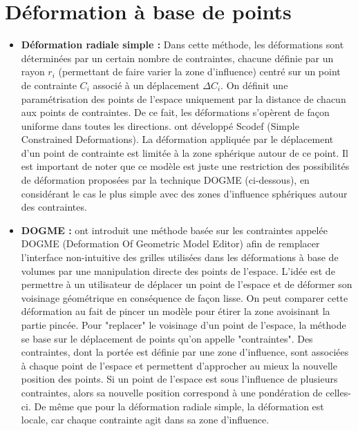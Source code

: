 \section{Déformation à base de points}

\begin{itemize}

\item{\textbf{Déformation radiale simple :}} Dans cette méthode, les
déformations sont déterminées par un certain nombre de contraintes, chacune
définie par un rayon $r_i$ (permettant de faire varier la zone d'influence)
centré sur un point de contrainte $C_i$ associé à un déplacement $\Delta C_i$.
On définit une paramétrisation des points de l'espace uniquement par la
distance de chacun aux points de contraintes. De ce fait, les déformations
s'opèrent de façon uniforme dans toutes les directions. \cite{BR94} ont
développé Scodef (Simple Constrained Deformations). La déformation appliquée
par le déplacement d'un point de contrainte est limitée à la zone sphérique
autour de ce point. Il est important de noter que ce modèle est juste une
restriction des possibilités de déformation proposées par la technique DOGME
(ci-dessous), en considérant le cas le plus simple avec des zones d'influence
sphériques autour des contraintes.

\item{\textbf{DOGME :}} \cite{BB91} ont introduit une méthode basée sur les
contraintes appelée DOGME (Deformation Of Geometric Model Editor) afin de
remplacer l'interface non-intuitive des grilles utilisées dans les déformations
à base de volumes par une manipulation directe des points de l'espace. L'idée
est de permettre à un utilisateur de déplacer un point de l'espace et de
déformer son voisinage géométrique en conséquence de façon lisse. On peut
comparer cette déformation au fait de pincer un modèle pour étirer la zone
avoisinant la partie pincée. Pour "replacer" le voisinage d'un point de
l'espace, la méthode se base sur le déplacement de points qu'on appelle
"contraintes". Des contraintes, dont la portée est définie par une
zone d'influence, sont associées à chaque point de l'espace et permettent
d'approcher au mieux la nouvelle position des points. Si un point de l'espace
est sous l'influence de plusieurs contraintes, alors sa nouvelle position
correspond à une pondération de celles-ci. De même que pour la déformation
radiale simple, la déformation est locale, car chaque contrainte agit dans sa
zone d'influence.

\end{itemize}